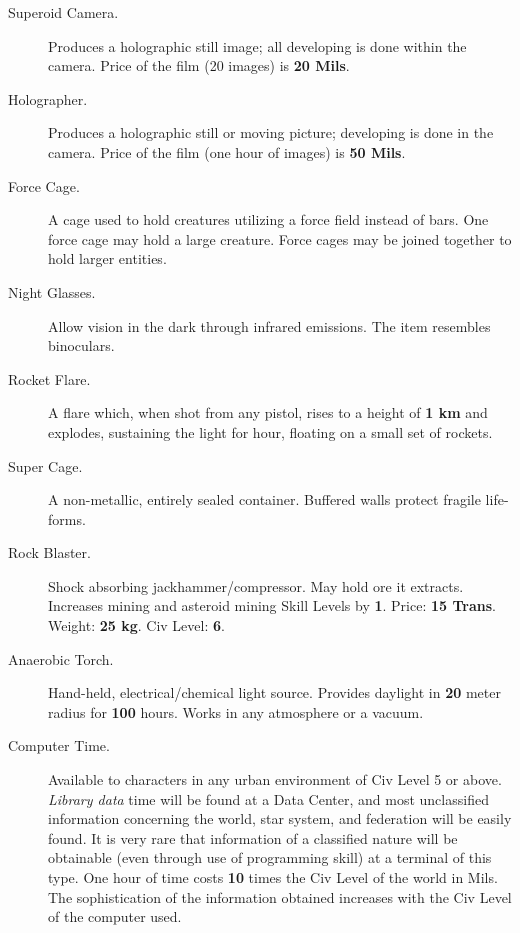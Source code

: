 \begin{description}
\item[\hypertarget{tag:superoid}{Superoid Camera}.] Produces a holographic still image; all
  developing is done within the camera. Price of the film (20 images)
  is \textbf{20 Mils}.
\item[\hypertarget{tag:Holographer}{Holographer}.] Produces a holographic still or moving picture;
  developing is done in the camera. Price of the film (one hour of
  images) is \textbf{50 Mils}.
\item[Force Cage.] A cage used to hold creatures utilizing a force
  field instead of bars. One force cage may hold a large creature.
  Force cages may be joined together to hold larger entities.
\item[Night Glasses.] Allow vision in the dark through infrared
  emissions. The item resembles binoculars.
\item[Rocket Flare.] A flare which, when shot from any pistol, rises
  to a height of \textbf{1 km} and explodes, sustaining the light for
  \textbf{\textonehalf} hour, floating on a small set of rockets.
\item[Super Cage.] A non-metallic, entirely sealed container. Buffered
  walls protect fragile life-forms.
\item[\hypertarget{tag:rock-blaster}{Rock Blaster}.] Shock absorbing jackhammer/compressor. May hold
  ore it extracts. Increases mining and asteroid mining Skill Levels
  by \textbf{1}. Price: \textbf{15 Trans}. Weight: \textbf{25 kg}. Civ
  Level: \textbf{6}.
\item[Anaerobic Torch.] Hand-held, electrical/chemical light source.
  Provides daylight in \textbf{20} meter radius for \textbf{100}
  hours.  Works in any atmosphere or a vacuum.
\item[Computer Time.] Available to characters in any urban environment
  of Civ Level 5 or above. \emph{Library data} time will be found at a
  Data Center, and most unclassified information concerning the world,
  star system, and federation will be easily found. It is very rare
  that information of a classified nature will be obtainable (even
  through use of programming skill) at a terminal of this type. One
  hour of time costs \textbf{10} times the Civ Level of the world in
  Mils. The sophistication of the information obtained increases with
  the Civ Level of the computer used.
  

\end{description}
